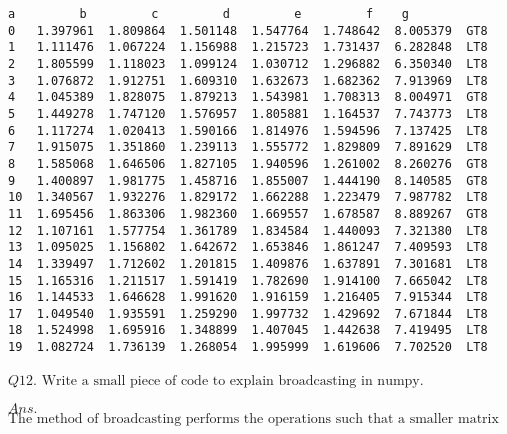 \documentclass[11pt]{article}
\begin{document}
    \begin{Verbatim}[commandchars=\\\{\}]
           a         b         c         d         e         f    g
0   1.397961  1.809864  1.501148  1.547764  1.748642  8.005379  GT8
1   1.111476  1.067224  1.156988  1.215723  1.731437  6.282848  LT8
2   1.805599  1.118023  1.099124  1.030712  1.296882  6.350340  LT8
3   1.076872  1.912751  1.609310  1.632673  1.682362  7.913969  LT8
4   1.045389  1.828075  1.879213  1.543981  1.708313  8.004971  GT8
5   1.449278  1.747120  1.576957  1.805881  1.164537  7.743773  LT8
6   1.117274  1.020413  1.590166  1.814976  1.594596  7.137425  LT8
7   1.915075  1.351860  1.239113  1.555772  1.829809  7.891629  LT8
8   1.585068  1.646506  1.827105  1.940596  1.261002  8.260276  GT8
9   1.400897  1.981775  1.458716  1.855007  1.444190  8.140585  GT8
10  1.340567  1.932276  1.829172  1.662288  1.223479  7.987782  LT8
11  1.695456  1.863306  1.982360  1.669557  1.678587  8.889267  GT8
12  1.107161  1.577754  1.361789  1.834584  1.440093  7.321380  LT8
13  1.095025  1.156802  1.642672  1.653846  1.861247  7.409593  LT8
14  1.339497  1.712602  1.201815  1.409876  1.637891  7.301681  LT8
15  1.165316  1.211517  1.591419  1.782690  1.914100  7.665042  LT8
16  1.144533  1.646628  1.991620  1.916159  1.216405  7.915344  LT8
17  1.049540  1.935591  1.259290  1.997732  1.429692  7.671844  LT8
18  1.524998  1.695916  1.348899  1.407045  1.442638  7.419495  LT8
19  1.082724  1.736139  1.268054  1.995999  1.619606  7.702520  LT8
    \end{Verbatim}

    \(Q12.\)
\(\text{Write a small piece of code to explain broadcasting in numpy.}\)

    \(Ans.\)
\(\text{The method of broadcasting performs the operations such that a smaller matrix or scalar value gets }\)\\
\end{document}

